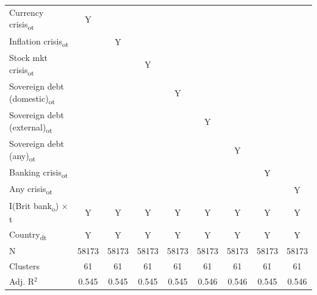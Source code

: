 {\begin{tabular}{l*{8}{c}}
Currency crisis\textsubscript{ot}&           Y   &               &               &               &               &               &               &               \\
Inflation crisis\textsubscript{ot}&               &           Y   &               &               &               &               &               &               \\
Stock mkt crisis\textsubscript{ot}&               &               &           Y   &               &               &               &               &               \\
Sovereign debt (domestic)\textsubscript{ot}&               &               &               &           Y   &               &               &               &               \\
Sovereign debt (external)\textsubscript{ot}&               &               &               &               &           Y   &               &               &               \\
Sovereign debt (any)\textsubscript{ot}&               &               &               &               &               &           Y   &               &               \\
Banking crisis\textsubscript{ot}&               &               &               &               &               &               &           Y   &               \\
Any crisis\textsubscript{ot}&               &               &               &               &               &               &               &           Y   \\
I(Brit bank\textsubscript{o}) $\times$ t&           Y   &           Y   &           Y   &           Y   &           Y   &           Y   &           Y   &           Y   \\
Country\textsubscript{dt}&           Y   &           Y   &           Y   &           Y   &           Y   &           Y   &           Y   &           Y   \\
\midrule
N           &       58173   &       58173   &       58173   &       58173   &       58173   &       58173   &       58173   &       58173   \\
Clusters    &          61   &          61   &          61   &          61   &          61   &          61   &          61   &          61   \\
Adj. R{$^2$}&       0.545   &       0.545   &       0.545   &       0.545   &       0.546   &       0.546   &       0.545   &       0.546   \\
\bottomrule
\end{tabular}
}
